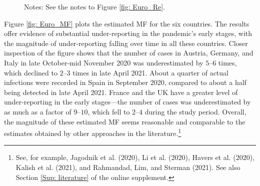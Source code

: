 \documentclass[12pt]{article}
\begin{document}
\begin{figure}[htp]
\begin{footnotesize}
%

\vspace{0cm}%
\footnotesize
Notes: See the notes to Figure \ref{fig: Euro_Re}.%

\end{footnotesize}%
%

\end{figure}%


Figure \ref{fig: Euro_MF} plots the estimated MF for the six countries. The
results offer evidence of substantial under-reporting in the pandemic's early
stages, with the magnitude of under-reporting falling over time in all these
countries. Closer inspection of the figure shows that the number of cases in
Austria, Germany, and Italy in late October-mid November 2020 was
underestimated by $5$--$6$ times, which declined to $2$--$3$ times in late
April 2021. About a quarter of actual infections were recorded in Spain in
September 2020, compared to about a half being detected in late April 2021.
France and the UK have a greater level of under-reporting in the early
stages---the number of cases was underestimated by as much as a factor of
$9$--$10$, which fell to $2$--$4$ during the study period. Overall, the
magnitude of these estimated MF seems reasonable and comparable to the
estimates obtained by other approaches in the literature.\footnote{See, for
example, Jagodnik et al. (2020), Li et al. (2020), Havers et al. (2020),
Kalish et al. (2021), and Rahmandad, Lim, and Sterman (2021). See also Section
\ref{Sup: literature} of the online supplement.}%
\end{document}
